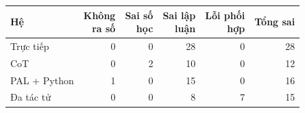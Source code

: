 \begin{tabular}{lrrrrr}
\toprule
Hệ & \makecell[r]{Không\\ra số} & \makecell[r]{Sai số\\học} & \makecell[r]{Sai lập\\luận} & \makecell[r]{Lỗi phối\\hợp} & Tổng sai \\
\midrule
Trực tiếp & 0 & 0 & 28 & 0 & 28 \\
CoT & 0 & 2 & 10 & 0 & 12 \\
PAL + Python & 1 & 0 & 15 & 0 & 16 \\
Đa tác tử & 0 & 0 & 8 & 7 & 15 \\
\bottomrule
\end{tabular}
